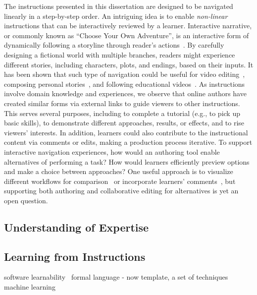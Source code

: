 The instructions presented in this dissertation are designed to be navigated linearly in a step-by-step order. An intriguing idea is to enable \emph{non-linear} instructions that can be interactively reviewed by a learner. Interactive narrative, or commonly known as ``Choose Your Own Adventure'', is an interactive form of dynamically following a storyline through reader's actions~\cite{RiedlInteractivenarrative}. By carefully designing a fictional world with multiple branches, readers might experience different stories, including characters, plots, and endings, based on their inputs.
%
It has been shown that such type of navigation could be useful for video editing~\cite{Shen:2009:WNE:1518701.1518825}, composing personal stories~\cite{Chi:2011:IAC:1943403.1943438}, and following educational videos~\cite{Kim:2014:DIT:2642918.2647389}.
%
As instructions involve domain knowledge and experiences, we observe that online authors have created similar forms via external links to guide viewers to other instructions. This serves several purposes, including to complete a tutorial (e.g., to pick up basic skills), to demonstrate different approaches, results, or effects, and to rise viewers' interests.
%
In addition, learners could also contribute to the instructional content via comments or edits, making a production process iterative.
To support interactive navigation experiences, how would an authoring tool enable alternatives of performing a task? How would learners efficiently preview options and make a choice between approaches?
%
One useful approach is to visualize different workflows for comparison~\cite{Kong:2012:DTR:2207676.2208549} or incorporate learners' comments~\cite{Bunt:2014:TPI:2556288.2557118}, but supporting both authoring and collaborative editing for alternatives is yet an open question.

\subsection{Understanding of Expertise}

\subsection{Learning from Instructions}

software learnability~\cite{Grossman:2009:SSL:1518701.1518803}
formal language
- now template, a set of techniques
machine learning

